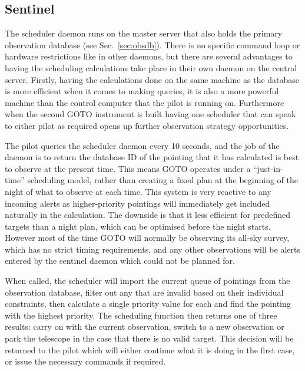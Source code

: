 \begin{colsection}
\begin{colsection}
\end{colsection}


\subsection{Sentinel}
\label{sec:sentinel}
\begin{colsection}

The scheduler daemon runs on the master server that also holds the primary observation database (see Sec.~\ref{sec:obsdb}). There is no specific command loop or hardware restrictions like in other daemons, but there are several advantages to having the scheduling calculations take place in their own daemon on the central server. Firstly, having the calculations done on the same machine as the database is more efficient when it comes to making queries, it is also a more powerful machine than the control computer that the pilot is running on. Furthermore when the second GOTO instrument is built having one scheduler that can speak to either pilot as required opens up further observation strategy opportunities.

The pilot queries the scheduler daemon every 10 seconds, and the job of the daemon is to return the database ID of the pointing that it has calculated is best to observe at the present time. This means GOTO operates under a ``just-in-time'' scheduling model, rather than creating a fixed plan at the beginning of the night of what to observe at each time. This system is very reactive to any incoming alerts as higher-priority pointings will immediately get included naturally in the calculation. The downside is that it less efficient for predefined targets than a night plan, which can be optimised before the night starts. However most of the time GOTO will normally be observing its all-sky survey, which has no strict timing requirements, and any other observations will be alerts entered by the sentinel daemon which could not be planned for.

When called, the scheduler will import the current queue of pointings from the observation database, filter out any that are invalid based on their individual constraints, then calculate a single priority value for each and find the pointing with the highest priority. The scheduling function then returns one of three results: carry on with the current observation, switch to a new observation or park the telescope in the case that there is no valid target. This decision will be returned to the pilot which will either continue what it is doing in the first case, or issue the necessary commands if required.


\end{colsection}
\end{colsection}

